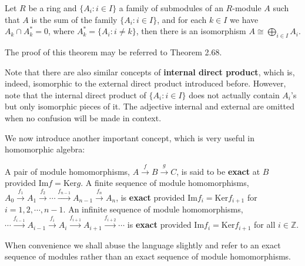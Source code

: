 \begin{theorem}
Let $R$ be a ring and $\{A_i:i\in I\}$ a family of submodules of an $R$-module $A$ such that $A$ is the sum of the family $\{A_i:i\in I\}$, and for each $k\in I$ we have $A_k\cap A_k^*=0$, where $A_k^*=\{A_i:i\ne k\}$, then there is an isomorphism $A\cong\bigoplus_{i\in I}A_i$.
\end{theorem}
The proof of this theorem may be referred to Theorem 2.68.\par
Note that there are also similar concepts of \textbf{internal direct product}, which is, indeed, isomorphic to the external direct product introduced before. However, note that the internal direct product of $\{A_i:i\in I\}$ does not actually contain $A_i$'s but only isomorphic pieces of it. The adjective internal and external are omitted when no confusion will be made in context.\par
We now introduce another important concept, which is very useful in homomorphic algebra: 
\begin{definition}
A pair of module homomorphisms, $A\overset{f}{\longrightarrow}B\overset{g}{\longrightarrow}C$, is said to be \textbf{exact} at $B$ provided $\mathrm{Im}f=\mathrm{Ker}g$. A finite sequence of module homomorphisms, $A_0\overset{f_1}{\longrightarrow}A_1\overset{f_2}{\longrightarrow}\cdots \overset{f_{n-1}}{\longrightarrow}A_{n-1}\overset{f_n}{\longrightarrow}A_n$, is \textbf{exact} provided $\mathrm{Im}f_i=\mathrm{Ker}f_{i+1}$ for $i=1,2,\cdots,n-1$. An infinite sequence of module homomorphisms, $\cdots \overset{f_{i-1}}{\longrightarrow}A_{i-1}\overset{f_i}{\longrightarrow}A_i\overset{f_{i+1}}{\longrightarrow}A_{i+1}\overset{f_{i+2}}{\longrightarrow}\cdots $ is \textbf{exact} provided $\mathrm{Im}f_i=\mathrm{Ker}f_{i+1}$ for all $i\in\mathbb{Z}$.
\end{definition}
When convenience we shall abuse the language slightly and refer to an exact sequence of modules rather than an exact sequence of module homomorphisms.
